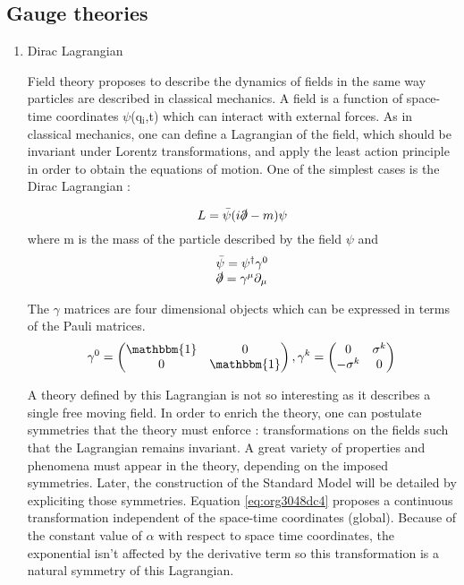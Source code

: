 \subsection{Gauge theories}
\label{sec:orga6a6451}
\begin{enumerate}
\item Dirac Lagrangian
\label{sec:org9b5a0cb}

Field theory proposes to describe the dynamics of fields in the same way particles are described in classical mechanics.
A field is a function of space-time coordinates \(\psi\)(q\(_{\text{i}}\),t) which can interact with external forces.
As in classical mechanics, one can define a Lagrangian of the field, which should be invariant under Lorentz transformations, and apply the least action principle in order to obtain the equations of motion.
One of the simplest cases is the Dirac Lagrangian :

\begin{equation}
\label{eq:orge86da29}
L = \bar{\psi}(i\slashed{\partial} -m)\psi
\end{equation}
where m is the mass of the particle described by the field \(\psi\) and
\begin{equation}
\begin{array}{l}
\bar{\psi} = \psi^\dagger \gamma^0\\
\slashed{\partial}=\gamma^\mu\partial_\mu
\end{array}
\end{equation}

The \(\gamma\) matrices are four dimensional objects which can be expressed in terms of the Pauli matrices.
\begin{equation}
\gamma^0=
\begin{pmatrix}
 \mathbbm{1} & 0 \\
0&  \mathbbm{1}
\end{pmatrix},
\gamma^k =
\begin{pmatrix}
 0&\sigma^k \\
-\sigma^k & 0
\end{pmatrix}
\end{equation}


A theory defined by this Lagrangian is not so interesting as it describes a single free moving field.
In order to enrich the theory, one can postulate symmetries that the theory must enforce : transformations on the fields such that the Lagrangian remains invariant.
A great variety of properties and phenomena must appear in the theory, depending on the imposed symmetries.
Later, the construction of the Standard Model will be detailed by expliciting those symmetries.
Equation \ref{eq:org3048dc4} proposes a continuous transformation independent of the space-time coordinates (global).
Because of the constant value of \(\alpha\) with respect to space time coordinates, the exponential isn't affected by the derivative term so this transformation is a natural symmetry of this Lagrangian.



\end{enumerate}
